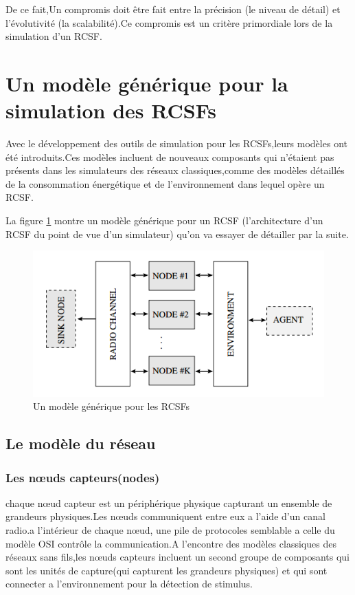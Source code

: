 De ce fait,Un compromis doit être fait entre la précision (le niveau de détail) et l'évolutivité (la scalabilité).Ce compromis est un critère primordiale lors de la simulation d'un RCSF.

\section{Un modèle générique  pour la simulation des RCSFs}
Avec le développement des outils de simulation pour les RCSFs,leurs modèles ont été introduits.Ces modèles incluent de nouveaux composants qui n'étaient pas présents dans les simulateurs des réseaux classiques,comme des modèles détaillés de la consommation énergétique et de l'environnement dans lequel opère un RCSF.

La figure \ref{netModel} montre un modèle générique pour un RCSF (l'architecture d'un RCSF du point de vue d'un simulateur) qu'on va essayer de détailler par la suite.

\begin{figure}[!h]
\includegraphics[scale=0.8]{netModel}
\caption{\label{netModel}Un modèle générique pour les RCSFs}
\end{figure}

\subsection{Le modèle du réseau}
\subsubsection{Les nœuds capteurs(nodes)}
chaque nœud capteur est un périphérique physique capturant un ensemble de grandeurs physiques.Les nœuds communiquent entre eux a l'aide d'un canal radio.a l'intérieur de chaque nœud, une pile de protocoles semblable a celle du modèle OSI contrôle la communication.A l'encontre des modèles classiques des réseaux sans fils,les nœuds capteurs incluent un second groupe de composants qui sont les unités de capture(qui capturent les grandeurs physiques) et qui sont connecter a l'environnement pour la détection de stimulus.

